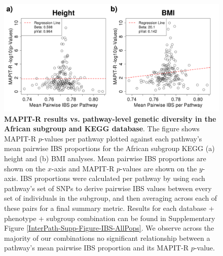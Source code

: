 \documentclass[12pt,a4paper]{article}
\begin{document}

\begin{figure}[htb]
\centering
\includegraphics[scale=.35]{Images/Main/InterPath_Main_Figure_IBS_vs4_African_noHLA.png}
\caption[TBD]{\textbf{MAPIT-R results vs. pathway-level genetic diversity in the African subgroup and KEGG database}. The figure shows MAPIT-R $p$-values per pathway plotted against each pathway's mean pairwise IBS proportions for the African subgroup KEGG (a) height and (b) BMI analyses. Mean pairwise IBS proportions are shown on the $x$-axis and MAPIT-R $p$-values are shown on the $y$-axis. IBS proportions were calculated per pathway by using each pathway's set of SNPs to derive pairwise IBS values between every set of individuals in the subgroup, and then averaging across each of these pairs for a final summary metric. Results for each database + phenotype + subgroup combination can be found in Supplementary Figure \ref{InterPath-Supp-Figure-IBS-AllPops}. We observe across the majority of our combinations no significant relationship between a pathway's mean pairwise IBS proportion and its MAPIT-R $p$-value.}
\label{InterPath-Main-Figure-IBS-African}
\end{figure}
\end{document}
